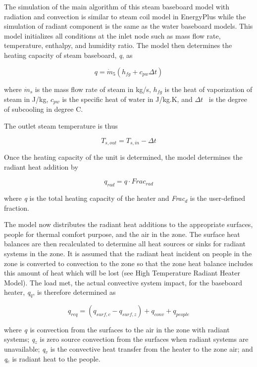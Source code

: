 The simulation of the main algorithm of this steam baseboard model with radiation and convection is similar to steam coil model in EnergyPlus while the simulation of radiant component is the same as the water baseboard models. This model initializes all conditions at the inlet node such as mass flow rate, temperature, enthalpy, and humidity ratio. The model then determines the heating capacity of steam baseboard, \emph{q}, as

\begin{equation}
q = {\dot m_5}({h_{fg}} + {c_{pw}}\Delta t)
\end{equation}

where \({\dot m_s}\) is the mass flow rate of steam in kg/s, \({h_{fg}}\) is the heat of vaporization of steam in J/kg, \({c_{pw}}\) is the specific heat of water in J/kg.K, and \(\Delta t\) ~is the degree of subcooling in degree C.

The outlet steam temperature is thus

\begin{equation}
{T_{s,out}} = {T_{s,in}} - \Delta t
\end{equation}

Once the heating capacity of the unit is determined, the model determines the radiant heat addition by

\begin{equation}
{q_{rad}} = q \cdot Fra{c_{rad}}
\end{equation}

where \emph{q} is the total heating capacity of the heater and \emph{Frac\(_{d}\)} is the user-defined fraction.

The model now distributes the radiant heat additions to the appropriate surfaces, people for thermal comfort purpose, and the air in the zone. The surface heat balances are then recalculated to determine all heat sources or sinks for radiant systems in the zone. It is assumed that the radiant heat incident on people in the zone is converted to convection to the zone so that the zone heat balance includes this amount of heat which will be lost (see High Temperature Radiant Heater Model). The load met, the actual convective system impact, for the baseboard heater, \emph{q\(_{q}\)}, is therefore determined as

\begin{equation}
{q_{req}} = ({q_{surf,c}} - {q_{surf,z}}) + {q_{conv}} + {q_{people}}
\end{equation}

where \emph{q\(_{ }\)} is convection from the surfaces to the air in the zone with radiant systems; \emph{q\(_{z}\)} is zero source convection from the surfaces when radiant systems are unavailable; \emph{q\(_{v}\)} is the convective heat transfer from the heater to the zone air; and \emph{q\(_{e}\)} is radiant heat to the people.

